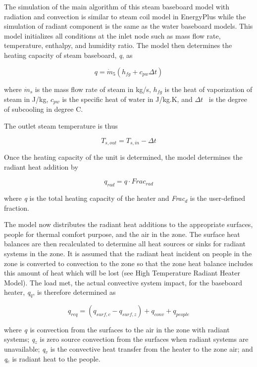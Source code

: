 The simulation of the main algorithm of this steam baseboard model with radiation and convection is similar to steam coil model in EnergyPlus while the simulation of radiant component is the same as the water baseboard models. This model initializes all conditions at the inlet node such as mass flow rate, temperature, enthalpy, and humidity ratio. The model then determines the heating capacity of steam baseboard, \emph{q}, as

\begin{equation}
q = {\dot m_5}({h_{fg}} + {c_{pw}}\Delta t)
\end{equation}

where \({\dot m_s}\) is the mass flow rate of steam in kg/s, \({h_{fg}}\) is the heat of vaporization of steam in J/kg, \({c_{pw}}\) is the specific heat of water in J/kg.K, and \(\Delta t\) ~is the degree of subcooling in degree C.

The outlet steam temperature is thus

\begin{equation}
{T_{s,out}} = {T_{s,in}} - \Delta t
\end{equation}

Once the heating capacity of the unit is determined, the model determines the radiant heat addition by

\begin{equation}
{q_{rad}} = q \cdot Fra{c_{rad}}
\end{equation}

where \emph{q} is the total heating capacity of the heater and \emph{Frac\(_{d}\)} is the user-defined fraction.

The model now distributes the radiant heat additions to the appropriate surfaces, people for thermal comfort purpose, and the air in the zone. The surface heat balances are then recalculated to determine all heat sources or sinks for radiant systems in the zone. It is assumed that the radiant heat incident on people in the zone is converted to convection to the zone so that the zone heat balance includes this amount of heat which will be lost (see High Temperature Radiant Heater Model). The load met, the actual convective system impact, for the baseboard heater, \emph{q\(_{q}\)}, is therefore determined as

\begin{equation}
{q_{req}} = ({q_{surf,c}} - {q_{surf,z}}) + {q_{conv}} + {q_{people}}
\end{equation}

where \emph{q\(_{ }\)} is convection from the surfaces to the air in the zone with radiant systems; \emph{q\(_{z}\)} is zero source convection from the surfaces when radiant systems are unavailable; \emph{q\(_{v}\)} is the convective heat transfer from the heater to the zone air; and \emph{q\(_{e}\)} is radiant heat to the people.

